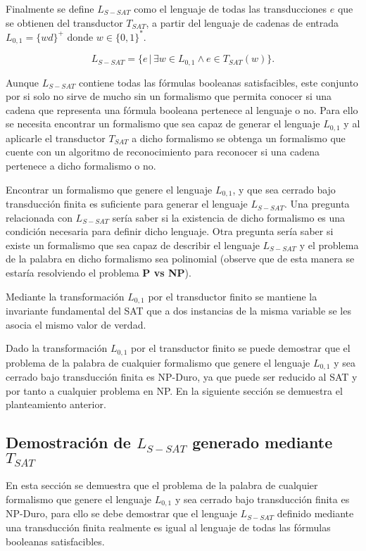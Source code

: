 \documentclass[12pt]{article}
\begin{document}
Finalmente se define $L_{S-SAT}$ como el lenguaje de todas las transducciones $e$ que se obtienen del transductor $T_{SAT}$, a partir del lenguaje de cadenas de entrada $L_{0,1}=\{wd\}^+$ donde $w\in \{0,1\}^*$.

$$L_{S-SAT} = \{e\,|\,\exists w \in L_{0,1} \wedge e \in T_{SAT}(w) \}.$$

Aunque $L_{S-SAT}$ contiene todas las fórmulas booleanas satisfacibles, este conjunto por si 
solo no sirve de mucho sin un formalismo que permita conocer si una cadena que representa una fórmula booleana 
pertenece al lenguaje o no. Para ello se necesita encontrar un formalismo que sea capaz de generar el lenguaje 
$L_{0,1}$ y al aplicarle el transductor $T_{SAT}$ a dicho formalismo se obtenga un formalismo que cuente con un 
algoritmo de reconocimiento para reconocer si una cadena pertenece a dicho formalismo o no.

Encontrar un formalismo que genere el lenguaje $L_{0,1}$, y que sea cerrado bajo transducción finita es 
suficiente para generar el lenguaje $L_{S-SAT}$. Una pregunta relacionada con $L_{S-SAT}$
sería saber si la existencia de dicho formalismo es una condición necesaria para definir dicho lenguaje. 
Otra pregunta sería saber si existe un formalismo que sea capaz de describir el lenguaje $L_{S-SAT}$ y 
el problema de la palabra en dicho formalismo sea polinomial (observe que de esta manera se estaría resolviendo el problema \textbf{P vs NP}).

Mediante la transformación $L_{0,1}$ por el transductor finito se mantiene la invariante fundamental del SAT que a dos instancias de la misma variable se les asocia el mismo valor de verdad.

Dado la transformación $L_{0,1}$ por el transductor finito se puede demostrar que el problema de la palabra de 
cualquier formalismo que genere el lenguaje $L_{0,1}$ y sea cerrado bajo transducción finita es NP-Duro, 
ya que puede ser reducido al SAT y por tanto a cualquier problema en NP. En la siguiente sección se demuestra
el planteamiento anterior.

\subsection{Demostración de $L_{S-SAT}$ generado mediante $T_{SAT}$}

En esta sección se demuestra que el problema de la palabra de cualquier formalismo que genere el lenguaje $L_{0,1}$ y sea cerrado bajo transducción
finita es NP-Duro, para ello se debe demostrar que el lenguaje $L_{S-SAT}$ definido mediante una transducción finita
realmente es igual al lenguaje de todas las fórmulas booleanas satisfacibles.
\end{document}
